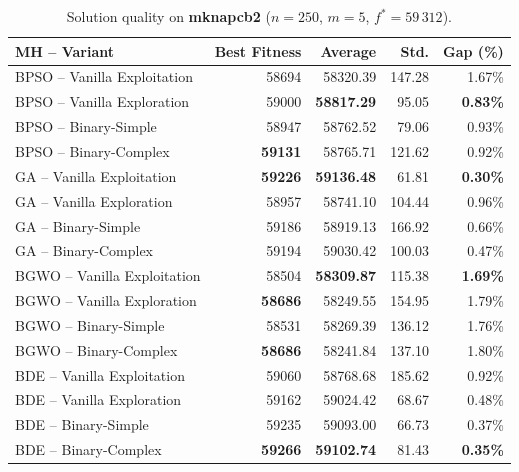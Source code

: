 \documentclass[journal,article,submit,moreauthors]{Definitions/mdpi}
\begin{document}
\begin{table}[htbp]
  \centering
  \small
  \caption{Solution quality on \textbf{mknapcb2}
  ($n=250$, $m=5$, $f^*=59\,312$).}
  \label{tab:calidad_mknapcb2}
  \begin{tabular}{lrrrr}
    \toprule
    \textbf{MH -- Variant} &
    \textbf{Best Fitness} &
    \textbf{Average} &
    \textbf{Std.} &
    \textbf{Gap (\%)} \\
    \midrule
    BPSO -- Vanilla Exploitation & 58694 & 58320.39 & 147.28 & 1.67\% \\
    BPSO -- Vanilla Exploration  & 59000 & \textbf{58817.29} & 95.05 & \textbf{0.83\%} \\
    BPSO -- Binary-Simple        & 58947 & 58762.52 & 79.06 & 0.93\% \\
    BPSO -- Binary-Complex       & \textbf{59131} & 58765.71 & 121.62 & 0.92\% \\
    \midrule
    GA -- Vanilla Exploitation   & \textbf{59226} & \textbf{59136.48} & 61.81 & \textbf{0.30\%} \\
    GA -- Vanilla Exploration    & 58957 & 58741.10 & 104.44 & 0.96\% \\
    GA -- Binary-Simple          & 59186 & 58919.13 & 166.92 & 0.66\% \\
    GA -- Binary-Complex         & 59194 & 59030.42 & 100.03 & 0.47\% \\
    \midrule
    BGWO -- Vanilla Exploitation & 58504 & \textbf{58309.87} & 115.38 & \textbf{1.69\%} \\
    BGWO -- Vanilla Exploration  & \textbf{58686} & 58249.55 & 154.95 & 1.79\% \\
    BGWO -- Binary-Simple        & 58531 & 58269.39 & 136.12 & 1.76\% \\
    BGWO -- Binary-Complex       & \textbf{58686} & 58241.84 & 137.10 & 1.80\% \\
    \midrule
    BDE -- Vanilla Exploitation  & 59060 & 58768.68 & 185.62 & 0.92\% \\
    BDE -- Vanilla Exploration   & 59162 & 59024.42 & 68.67 & 0.48\% \\
    BDE -- Binary-Simple         & 59235 & 59093.00 & 66.73 & 0.37\% \\
    BDE -- Binary-Complex        & \textbf{59266} & \textbf{59102.74} & 81.43 & \textbf{0.35\%} \\
    \bottomrule
  \end{tabular}
\end{table}
\end{document}
